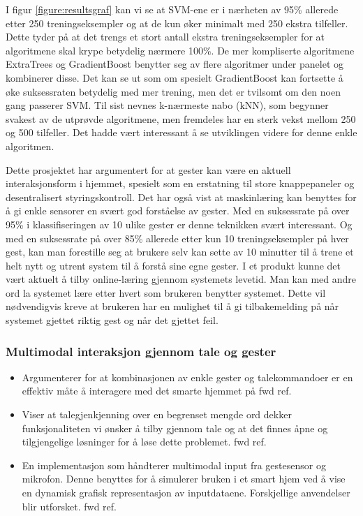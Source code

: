 I figur \ref{figure:resultsgraf} kan vi se at SVM-ene er i nærheten av 95\% allerede etter 250 treningseksempler og at de kun øker minimalt med 250 ekstra tilfeller. Dette tyder på at det trengs et stort antall ekstra treningseksempler for at algoritmene skal krype betydelig nærmere 100\%. De mer kompliserte algoritmene ExtraTrees og GradientBoost benytter seg av flere algoritmer under panelet og kombinerer disse. Det kan se ut som om spesielt GradientBoost kan fortsette å øke suksessraten betydelig med mer trening, men det er tvilsomt om den noen gang passerer SVM. Til sist nevnes k-nærmeste nabo (kNN), som begynner svakest av de utprøvde algoritmene, men fremdeles har en sterk vekst mellom 250 og 500 tilfeller. Det hadde vært interessant å se utviklingen videre for denne enkle algoritmen.

Dette prosjektet har argumentert for at gester kan være en aktuell interaksjonsform i hjemmet, spesielt som en erstatning til store knappepaneler og desentralisert styringskontroll. Det har også vist at maskinlæring kan benyttes for å gi enkle sensorer en svært god forståelse av gester. Med en suksessrate på over 95\% i klassifiseringen av 10 ulike gester er denne teknikken svært interessant. Og med en suksessrate på over 85\% allerede etter kun 10 treningseksempler på hver gest, kan man forestille seg at brukere selv kan sette av 10 minutter til å trene et helt nytt og utrent system til å forstå sine egne gester. I et produkt kunne det vært aktuelt å tilby online-læring gjennom systemets levetid. Man kan med andre ord la systemet lære etter hvert som brukeren benytter systemet. Dette vil nødvendigvis kreve at brukeren har en mulighet til å gi tilbakemelding på når systemet gjettet riktig gest og når det gjettet feil.


\subsubsection*{Multimodal interaksjon gjennom tale og gester}
\begin{itemize}
\item Argumenterer for at kombinasjonen av enkle gester og talekommandoer er en effektiv måte å interagere med det smarte hjemmet på {\color{red} fwd ref}.
\item Viser at talegjenkjenning over en begrenset mengde ord dekker funksjonaliteten vi ønsker å tilby gjennom tale og at det finnes åpne og tilgjengelige løsninger for å løse dette problemet.{\color{red} fwd ref}.
\item En implementasjon som håndterer multimodal input fra gestesensor og mikrofon. Denne benyttes for å simulerer bruken i et smart hjem ved å vise en dynamisk grafisk representasjon av inputdataene. Forskjellige anvendelser blir utforsket. {\color{red} fwd ref}.
\end{itemize}


